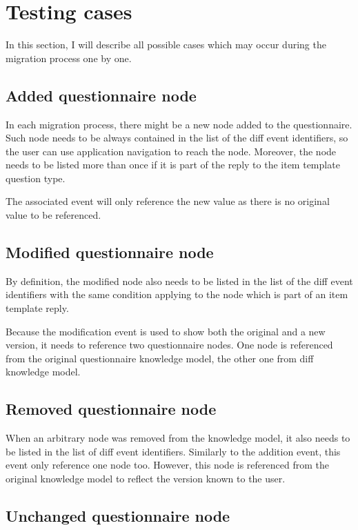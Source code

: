 \section{Testing cases}\label{sec:testing-cases}

In this section, I will describe all possible cases which may occur during the migration process one by one.

\subsection{Added questionnaire node}

In each migration process, there might be a new node added to the questionnaire.
Such node needs to be always contained in the list of the diff event identifiers, so the user can use application navigation to reach the node.
Moreover, the node needs to be listed more than once if it is part of the reply to the item template question type.

The associated event will only reference the new value as there is no original value to be referenced.

\subsection{Modified questionnaire node}

By definition, the modified node also needs to be listed in the list of the diff event identifiers with the same condition applying to the node which is part of an item template reply.

Because the modification event is used to show both the original and a new version, it needs to reference two questionnaire nodes.
One node is referenced from the original questionnaire knowledge model, the other one from diff knowledge model.

\subsection{Removed questionnaire node}

When an arbitrary node was removed from the knowledge model, it also needs to be listed in the list of diff event identifiers.
Similarly to the addition event, this event only reference one node too.
However, this node is referenced from the original knowledge model to reflect the version known to the user.

\subsection{Unchanged questionnaire node}

